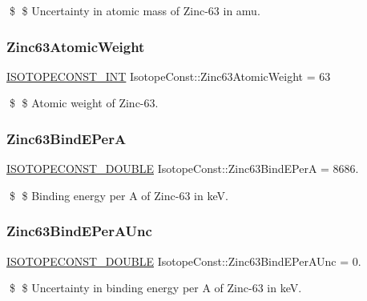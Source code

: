 \$ \$ Uncertainty in atomic mass of Zinc-\/63 in amu. \mbox{\label{group___isotope_const-_zinc-_zn63_gad5361fec700da295d9391bcbee80a3dc}} 
\subsubsection{\texorpdfstring{Zinc63\+Atomic\+Weight}{Zinc63AtomicWeight}}
{\footnotesize\ttfamily \mbox{\hyperlink{group___isotope_const-_macros_ga5f18360b3e99483a35c32d789e62621c}{I\+S\+O\+T\+O\+P\+E\+C\+O\+N\+S\+T\+\_\+\+I\+NT}} Isotope\+Const\+::\+Zinc63\+Atomic\+Weight = 63}

\$ \$ Atomic weight of Zinc-\/63. \mbox{\label{group___isotope_const-_zinc-_zn63_gaf4293dc5122cb2fdc4b144248fe54baf}} 
\subsubsection{\texorpdfstring{Zinc63\+Bind\+E\+PerA}{Zinc63BindEPerA}}
{\footnotesize\ttfamily \mbox{\hyperlink{group___isotope_const-_macros_ga8f45a7272ce02c0b4c65c44636ed719a}{I\+S\+O\+T\+O\+P\+E\+C\+O\+N\+S\+T\+\_\+\+D\+O\+U\+B\+LE}} Isotope\+Const\+::\+Zinc63\+Bind\+E\+PerA = 8686.}

\$ \$ Binding energy per A of Zinc-\/63 in keV. \mbox{\label{group___isotope_const-_zinc-_zn63_gae4492686b3cb7bd0c008abb0647c8ca7}} 
\subsubsection{\texorpdfstring{Zinc63\+Bind\+E\+Per\+A\+Unc}{Zinc63BindEPerAUnc}}
{\footnotesize\ttfamily \mbox{\hyperlink{group___isotope_const-_macros_ga8f45a7272ce02c0b4c65c44636ed719a}{I\+S\+O\+T\+O\+P\+E\+C\+O\+N\+S\+T\+\_\+\+D\+O\+U\+B\+LE}} Isotope\+Const\+::\+Zinc63\+Bind\+E\+Per\+A\+Unc = 0.}

\$ \$ Uncertainty in binding energy per A of Zinc-\/63 in keV. \mbox{\label{group___isotope_const-_zinc-_zn63_ga1c304ecfd48ba069b213e58df3020a7e}} 
